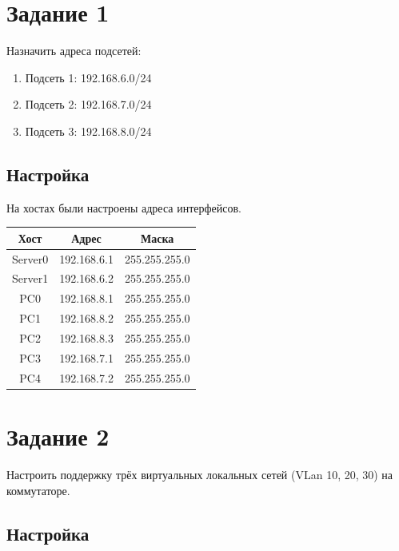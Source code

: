 \documentclass[a4paper,oneside,12pt]{extreport}
\begin{document}


\tableofcontents

\chapter{Задание 1}

Назначить адреса подсетей:
\begin{enumerate}
	\item Подсеть 1: 192.168.6.0/24
	\item Подсеть 2: 192.168.7.0/24
	\item Подсеть 3: 192.168.8.0/24
\end{enumerate}

\section{Настройка}

На хостах были настроены адреса интерфейсов.

\begin{table}[H]
	\centering
	\begin{tabular}{|c|c|c|}
		\hline
		\textbf{Хост} & \textbf{Адрес} & \textbf{Маска} \\ \hline
		Server0       & 192.168.6.1    & 255.255.255.0  \\ \hline
		Server1       & 192.168.6.2    & 255.255.255.0  \\ \hline
		PC0           & 192.168.8.1    & 255.255.255.0  \\ \hline
		PC1           & 192.168.8.2    & 255.255.255.0  \\ \hline
		PC2           & 192.168.8.3    & 255.255.255.0  \\ \hline
		PC3           & 192.168.7.1    & 255.255.255.0  \\ \hline
		PC4           & 192.168.7.2    & 255.255.255.0  \\ \hline
	\end{tabular}
\end{table}

\chapter{Задание 2}

Настроить поддержку трёх виртуальных локальных сетей (VLan 10, 20, 30) на коммутаторе.

\section{Настройка}
\end{document}
